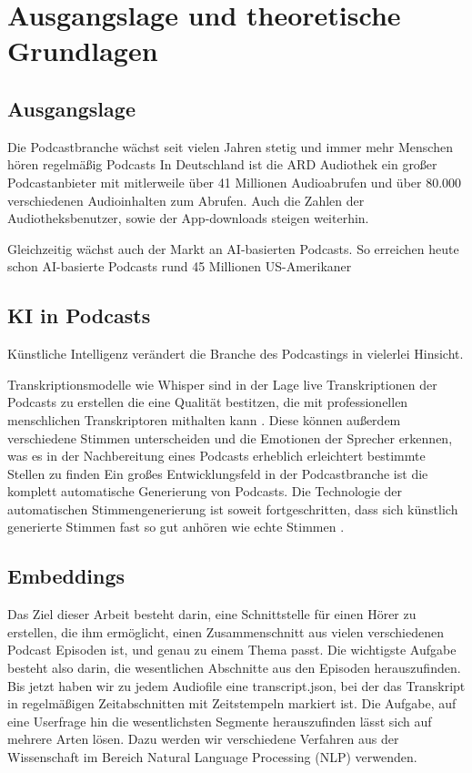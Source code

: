 \chapter{Ausgangslage und theoretische Grundlagen}\label{ch:data}

\section{Ausgangslage}
 
Die Podcastbranche wächst seit vielen Jahren stetig und immer mehr Menschen hören regelmäßig Podcasts 
In Deutschland ist die ARD Audiothek ein großer Podcastanbieter mit mitlerweile über 41 Millionen Audioabrufen und über 80.000 verschiedenen Audioinhalten zum Abrufen. Auch die Zahlen der Audiotheksbenutzer, sowie der App-downloads steigen weiterhin. \cite{gotting2023}

Gleichzeitig wächst auch der Markt an AI-basierten Podcasts. So erreichen heute schon AI-basierte Podcasts rund 45 Millionen US-Amerikaner 

\section{KI in Podcasts}

Künstliche Intelligenz verändert die Branche des Podcastings in vielerlei Hinsicht. 

Transkriptionsmodelle wie Whisper sind in der Lage live Transkriptionen der Podcasts zu erstellen die eine Qualität bestitzen, die mit professionellen menschlichen Transkriptoren mithalten kann \cite{radford}.
Diese können außerdem verschiedene Stimmen unterscheiden und die Emotionen der Sprecher erkennen, was es in der Nachbereitung eines Podcasts erheblich erleichtert bestimmte Stellen zu finden \cite{wagner2023}
Ein großes Entwicklungsfeld in der Podcastbranche ist die komplett automatische Generierung von Podcasts. Die Technologie der automatischen Stimmengenerierung ist soweit fortgeschritten, dass sich künstlich generierte Stimmen fast so gut anhören wie echte Stimmen \cite{shi2023}.


\section{Embeddings}

Das Ziel dieser Arbeit besteht darin, eine Schnittstelle für einen Hörer zu erstellen, die ihm ermöglicht, einen Zusammenschnitt aus vielen verschiedenen Podcast Episoden ist, und genau zu einem Thema passt. 
Die wichtigste Aufgabe besteht also darin, die wesentlichen Abschnitte aus den Episoden herauszufinden. 
Bis jetzt haben wir zu jedem Audiofile eine transcript.json, bei der das Transkript in regelmäßigen Zeitabschnitten mit Zeitstempeln markiert ist. 
Die Aufgabe, auf eine Userfrage hin die wesentlichsten Segmente herauszufinden lässt sich auf mehrere Arten lösen. 
Dazu werden wir verschiedene Verfahren aus der Wissenschaft im Bereich Natural Language Processing (NLP) verwenden.

